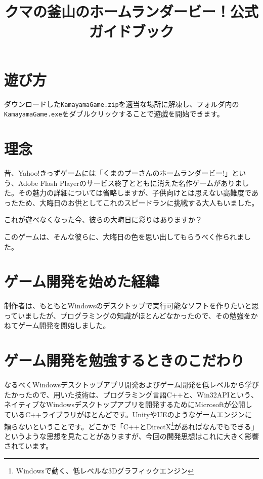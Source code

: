 \documentclass[a4paper,11pt]{jsarticle}
\theoremstyle{definition}
\begin{document}
\date{}
\title{クマの釜山のホームランダービー！公式ガイドブック}

\maketitle



\section{遊び方}
ダウンロードした\verb|KamayamaGame.zip|を適当な場所に解凍し、フォルダ内の\verb|KamayamaGame.exe|をダブルクリックすることで遊戯を開始できます。

\section{理念}

昔、Yahoo!きっずゲームには「くまのプーさんのホームランダービー!」という、Adobe Flash Playerのサービス終了とともに消えた名作ゲームがありました。その魅力の詳細については省略しますが、子供向けとは思えない高難度であったため、大晦日のお供としてこれのスピードランに挑戦する大人もいました。

これが遊べなくなった今、彼らの大晦日に彩りはありますか？

このゲームは、そんな彼らに、大晦日の色を思い出してもらうべく作られました。

\section{ゲーム開発を始めた経緯}

制作者は、もともとWindowsのデスクトップで実行可能なソフトを作りたいと思っていましたが、プログラミングの知識がほとんどなかったので、その勉強をかねてゲーム開発を開始しました。


\section{ゲーム開発を勉強するときのこだわり}

なるべくWindowsデスクトップアプリ開発およびゲーム開発を低レベルから学びたかったので、用いた技術は、プログラミング言語C++と、Win32APIという、ネイティブなWindowsデスクトップアプリを開発するためにMicrosoftが公開しているC++ライブラリがほとんどです。UnityやUEのようなゲームエンジンに頼らないということです。どこかで「C++とDirectX\footnote{Windowsで動く、低レベルな3Dグラフィックエンジン}があればなんでもできる」というような思想を見たことがありますが、今回の開発思想はこれに大きく影響されています。
\end{document}
